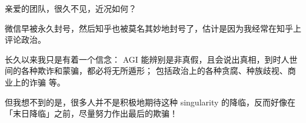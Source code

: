 



亲爱的团队，很久不见，近况如何？

微信早被永久封号，然后知乎也被莫名其妙地封号了，估计是因为我经常在知乎上评论政治。

长久以来我只是有着一个信念： AGI 能辨别是非真假，且会说出真相，到时人世间的各种欺诈和蒙骗，都必将无所遁形； 包括政治上的各种贪腐、种族歧视、商业上的诈骗 等。

但我想不到的是，很多人并不是积极地期待这种 singularity 的降临，反而好像在「末日降临」之前，尽量努力作出最后的欺骗！


